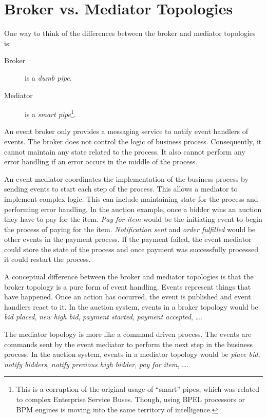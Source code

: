 \section{Broker vs. Mediator Topologies}\label{sec:broker-vs-mediator}

One way to think of the differences between the broker and mediator topologies is:
\begin{description}
    \item[Broker] is a \emph{dumb pipe}.
    \item[Mediator] is a \emph{smart pipe}\footnote{This is a corruption of the original usage of ``smart'' pipes,
    which was related to complex Enterprise Service Buses. Though, using BPEL processors or BPM engines is moving into the same territory of intelligence.}.
\end{description}

An event broker only provides a messaging service to notify event handlers of events.
The broker does not control the logic of business process.
Consequently, it cannot maintain any state related to the process.
It also cannot perform any error handling if an error occurs in the middle of the process.

An event mediator coordinates the implementation of the business process by sending events to start each step of the process.
This allows a mediator to implement complex logic.
This can include maintaining state for the process and performing error handling.
In the auction example, once a bidder wins an auction they have to pay for the item.
\emph{Pay for item} would be the initiating event to begin the process of paying for the item.
\emph{Notification sent} and \emph{order fulfilled} would be other events in the payment process.
If the payment failed, the event mediator could store the state of the process
and once payment was successfully processed it could restart the process.

A conceptual difference between the broker and mediator topologies is that the broker topology is a pure form of event handling.
Events represent things that have happened.
Once an action has occurred, the event is published and event handlers react to it.
In the auction system, events in a broker topology would be \emph{bid placed},
\emph{new high bid}, \emph{payment started}, \emph{payment accepted}, \dots.

The mediator topology is more like a command driven process.
The events are commands sent by the event mediator to perform the next step in the business process.
In the auction system, events in a mediator topology would be \emph{place bid},
\emph{notify bidders}, \emph{notify previous high bidder}, \emph{pay for item}, \dots.

